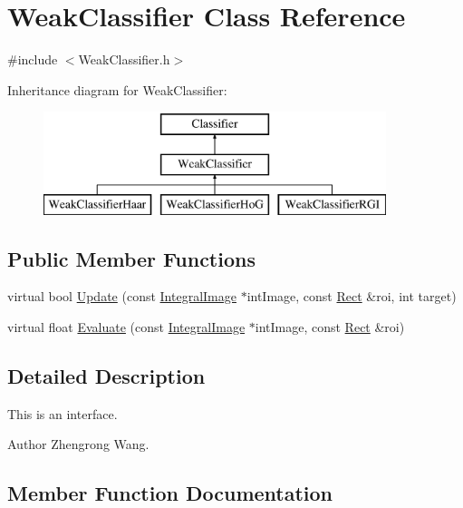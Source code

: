 \hypertarget{classWeakClassifier}{}\section{Weak\+Classifier Class Reference}
\label{classWeakClassifier}


{\ttfamily \#include $<$Weak\+Classifier.\+h$>$}

Inheritance diagram for Weak\+Classifier\+:\begin{figure}[H]
\begin{center}
\leavevmode
\includegraphics[height=3.000000cm]{classWeakClassifier}
\end{center}
\end{figure}
\subsection*{Public Member Functions}
\begin{DoxyCompactItemize}
\item 
virtual bool \hyperlink{classWeakClassifier_ad4c967e2f0d186a841722f8fea9dbd9c}{Update} (const \hyperlink{classIntegralImage}{Integral\+Image} $\ast$int\+Image, const \hyperlink{classRect}{Rect} \&roi, int target)
\item 
virtual float \hyperlink{classWeakClassifier_a083dddaa52fe399386f07a20f231ec49}{Evaluate} (const \hyperlink{classIntegralImage}{Integral\+Image} $\ast$int\+Image, const \hyperlink{classRect}{Rect} \&roi)
\end{DoxyCompactItemize}


\subsection{Detailed Description}
This is an interface. \begin{DoxyAuthor}{Author}
Zhengrong Wang. 
\end{DoxyAuthor}


\subsection{Member Function Documentation}
\hypertarget{classWeakClassifier_a083dddaa52fe399386f07a20f231ec49}{}
